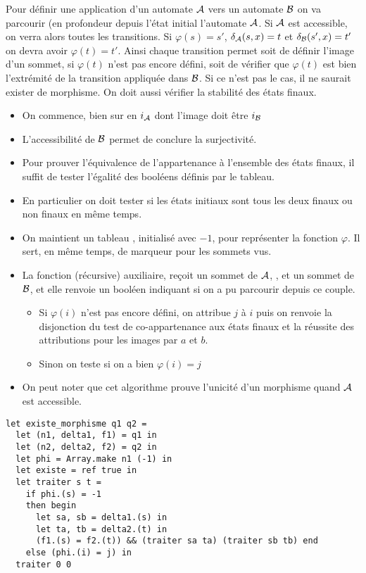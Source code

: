 \begin{Exercise}
Pour définir une application d'un automate ${\cal A}$ vers un automate ${\cal B}$ on va parcourir (en profondeur depuis l'état initial l'automate ${\cal A}$. Si ${\cal A}$ est accessible, on verra alors toutes les transitions. Si $\varphi(s) = s'$, $\delta_{\cal A}(s, x) = t$ et $\delta_{\cal B}(s', x) = t'$ on devra avoir $\varphi(t) = t'$. Ainsi chaque transition permet soit de définir l'image d'un sommet, si $\varphi(t)$ n'est pas encore défini,  soit de vérifier que $\varphi(t)$ est bien l’extrémité de la transition appliquée dans $\cal B$. Si ce n'est pas le cas, il ne saurait exister de morphisme. On doit aussi vérifier la stabilité des états finaux.

\begin{itemize}
\item On commence, bien sur en $i_{\cal A}$ dont l'image doit être $i_{\cal B}$

\item L'accessibilité de ${\cal B}$ permet de conclure la surjectivité. 

\item Pour prouver l'équivalence de l'appartenance à l'ensemble des états finaux, il suffit de tester l'égalité des booléens définis par le tableau.

\item En particulier on doit tester si les états initiaux sont tous les deux finaux ou non finaux en même temps.

\item On maintient un tableau , initialisé avec $-1$, pour représenter la fonction $\varphi$. Il sert, en même temps, de marqueur pour les sommets vus.

\item La fonction (récursive) auxiliaire, reçoit un sommet de ${\cal A}$, , et un sommet de ${\cal B}$,  et elle renvoie un booléen indiquant si on a pu parcourir depuis ce couple.
  \begin{itemize}
    \item Si $\varphi(i)$ n'est pas encore défini, on attribue $j$ à $i$ puis on renvoie la disjonction du test de co-appartenance aux états finaux et la réussite des attributions pour les images par $a$ et $b$.
    \item Sinon on teste si on a bien $\varphi(i) = j$
\end{itemize}

\item On peut noter que cet algorithme prouve l'unicité d'un morphisme quand ${\cal A}$ est accessible.
\end{itemize} 


\begin{lstlisting}
let existe_morphisme q1 q2 =
  let (n1, delta1, f1) = q1 in
  let (n2, delta2, f2) = q2 in
  let phi = Array.make n1 (-1) in
  let existe = ref true in
  let traiter s t =
    if phi.(s) = -1 
    then begin
      let sa, sb = delta1.(s) in
      let ta, tb = delta2.(t) in
      (f1.(s) = f2.(t)) && (traiter sa ta) (traiter sb tb) end
    else (phi.(i) = j) in
  traiter 0 0 
\end{lstlisting}
\end{Exercise}
